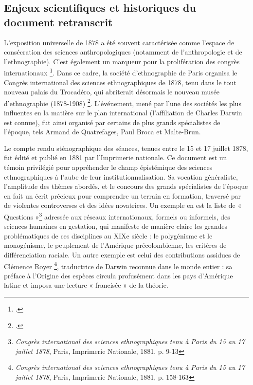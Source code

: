 \documentclass{article}
\begin{document}
	
	\subsection{Enjeux scientifiques et historiques du document retranscrit}
	
	L’exposition universelle de 1878 a été souvent caractérisée comme l’espace de consécration des sciences anthropologiques (notamment de l’anthropologie et de l’ethnographie). C’est également un marqueur pour la prolifération des congrès internationaux \footcite{rasmussenCongresInternationauxLies1989}. Dans ce cadre, la société d’ethnographie de Paris organisa le Congrès international des sciences ethnographiques de 1878, tenu dans le tout nouveau palais du Trocadéro, qui abriterait désormais le nouveau musée d’ethnographie (1878-1908) \footcite{legoffOrigineMuseeTrocadero2010}. L’événement, mené par l’une des sociétés les plus influentes en la matière sur le plan international (l’affiliation de Charles Darwin est connue), fut ainsi organisé par certains de plus grands spécialistes de l’époque, tels Armand de Quatrefages, Paul Broca et Malte-Brun. 
	
	Le compte rendu sténographique des séances, tenues entre le 15 et 17 juillet 1878, fut édité et publié en 1881 par l’Imprimerie nationale. Ce document est un témoin privilégié pour appréhender le champ épistémique des sciences ethnographiques à l’aube de leur institutionnalisation. Sa vocation généraliste, l’amplitude des thèmes abordés, et le concours des grands spécialistes de l’époque en fait un écrit précieux pour comprendre un terrain en formation, traversé par de violentes controverses et des idées novatrices. Un exemple en est la liste de « Questions »\footnote{\textit{Congrès international des sciences ethnographiques tenu à Paris du 15 au 17 juillet 1878}, Paris, Imprimerie Nationale, 1881, p. 9-13} adressée aux réseaux internationaux, formels ou informels, des sciences humaines en gestation, qui manifeste de manière claire les grandes problématiques de ces disciplines au XIXe siècle : le polygénisme et le monogénisme, le peuplement de l’Amérique précolombienne, les critères de différenciation raciale. Un autre exemple est celui des contributions assidues de Clémence Royer \footnote{\textit{Congrès international des sciences ethnographiques tenu à Paris du 15 au 17 juillet 1878}, Paris, Imprimerie Nationale, 1881, p. 158-163}, traductrice de Darwin reconnue dans le monde entier : sa préface à l’Origine des espèces circula profusément dans les pays d’Amérique latine et imposa une lecture « francisée » de la théorie. 
	
\end{document}

